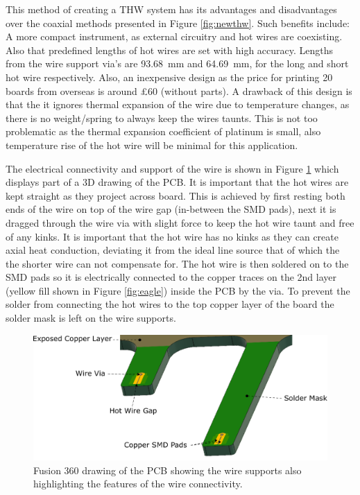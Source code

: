 \documentclass[12pt,MEng]{UoAThesis}
\begin{document}
This method of creating a THW system has its advantages and disadvantages over the coaxial methods presented in Figure \ref{fig:newthw}. Such benefits include: A more compact instrument, as external circuitry and hot wires are coexisting. Also that predefined lengths of hot wires are set with high accuracy. Lengths from the wire support via's are \SI{93.68}{\milli\meter} and \SI{64.69}{\milli\meter}, for the long and short hot wire respectively. Also, an inexpensive design as the price for printing 20 boards from overseas is around £60 (without parts). A drawback of this design is that the it ignores thermal expansion of the wire due to temperature changes, as there is no weight/spring to always keep the wires taunts. This is not too problematic as the thermal expansion coefficient of platinum is small, also temperature rise of the hot wire will be minimal for this application. 

The electrical connectivity and support of the wire is shown in Figure \ref{fig:wiresup} which displays part of a 3D drawing of the PCB. It is important that the hot wires are kept straight as they project across board. This is achieved by first resting both ends of the wire on top of the wire gap (in-between the SMD pads), next it is dragged through the wire via with slight force to keep the hot wire taunt and free of any kinks. It is important that the hot wire has no kinks as they can create axial heat conduction, deviating it from the ideal line source that of which the the shorter wire can not compensate for. The hot wire is then soldered on to the SMD pads so it is electrically connected to the copper traces on the 2nd layer (yellow fill shown in Figure \ref{fig:eagle}) inside the PCB by the via. To prevent the solder from connecting the hot wires to the top copper layer of the board the solder mask is left on the wire supports. 

\begin{figure}[htp]
  \centering
  \includegraphics[clip,width=0.7\linewidth]{figures/wiresupport.pdf}
  \caption{\label{fig:wiresup} Fusion 360 drawing of the PCB showing the wire supports also highlighting the features of the wire connectivity.}
\end{figure}
\end{document}
